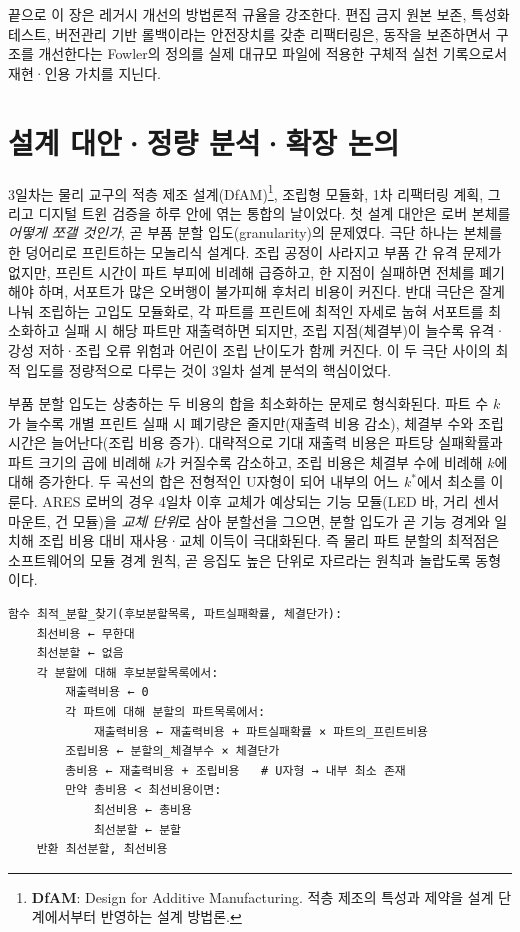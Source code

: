 끝으로 이 장은 레거시 개선의 방법론적 규율을 강조한다. 편집 금지 원본 보존\cite{ares-repo}, 특성화 테스트\cite{feathers2004legacy}, 버전관리 기반 롤백\cite{chacon2014progit, mcconnell2004codecomplete}이라는 안전장치를 갖춘 리팩터링은, 동작을 보존하면서 구조를 개선한다는 Fowler의 정의\cite{fowler2018refactoring}를 실제 대규모 파일에 적용한 구체적 실천 기록으로서 재현·인용 가치를 지닌다.





\section{설계 대안·정량 분석·확장 논의}

3일차는 물리 교구의 적층 제조 설계(DfAM)\footnote{\textbf{DfAM}: Design for Additive Manufacturing. 적층 제조의 특성과 제약을 설계 단계에서부터 반영하는 설계 방법론.}, 조립형 모듈화, 1차 리팩터링 계획, 그리고 디지털 트윈 검증을 하루 안에 엮는 통합의 날이었다. 첫 설계 대안은 로버 본체를 \emph{어떻게 쪼갤 것인가}, 곧 부품 분할 입도(granularity)의 문제였다. 극단 하나는 본체를 한 덩어리로 프린트하는 모놀리식 설계다. 조립 공정이 사라지고 부품 간 유격 문제가 없지만, 프린트 시간이 파트 부피에 비례해 급증하고, 한 지점이 실패하면 전체를 폐기해야 하며, 서포트가 많은 오버행이 불가피해 후처리 비용이 커진다. 반대 극단은 잘게 나눠 조립하는 고입도 모듈화로, 각 파트를 프린트에 최적인 자세로 눕혀 서포트를 최소화하고 실패 시 해당 파트만 재출력하면 되지만, 조립 지점(체결부)이 늘수록 유격·강성 저하·조립 오류 위험과 어린이 조립 난이도가 함께 커진다. 이 두 극단 사이의 최적 입도를 정량적으로 다루는 것이 3일차 설계 분석의 핵심이었다.

부품 분할 입도는 상충하는 두 비용의 합을 최소화하는 문제로 형식화된다. 파트 수 $k$가 늘수록 개별 프린트 실패 시 폐기량은 줄지만(재출력 비용 감소), 체결부 수와 조립 시간은 늘어난다(조립 비용 증가). 대략적으로 기대 재출력 비용은 파트당 실패확률과 파트 크기의 곱에 비례해 $k$가 커질수록 감소하고, 조립 비용은 체결부 수에 비례해 $k$에 대해 증가한다. 두 곡선의 합은 전형적인 U자형이 되어 내부의 어느 $k^{*}$에서 최소를 이룬다. ARES 로버의 경우 4일차 이후 교체가 예상되는 기능 모듈(LED 바, 거리 센서 마운트, 건 모듈)을 \emph{교체 단위}로 삼아 분할선을 그으면, 분할 입도가 곧 기능 경계와 일치해 조립 비용 대비 재사용·교체 이득이 극대화된다. 즉 물리 파트 분할의 최적점은 소프트웨어의 모듈 경계 원칙, 곧 응집도 높은 단위로 자르라는 원칙\cite{martin2008cleancode}과 놀랍도록 동형이다.

\begin{verbatim}
함수 최적_분할_찾기(후보분할목록, 파트실패확률, 체결단가):
    최선비용 ← 무한대
    최선분할 ← 없음
    각 분할에 대해 후보분할목록에서:
        재출력비용 ← 0
        각 파트에 대해 분할의 파트목록에서:
            재출력비용 ← 재출력비용 + 파트실패확률 × 파트의_프린트비용
        조립비용 ← 분할의_체결부수 × 체결단가
        총비용 ← 재출력비용 + 조립비용   # U자형 → 내부 최소 존재
        만약 총비용 < 최선비용이면:
            최선비용 ← 총비용
            최선분할 ← 분할
    반환 최선분할, 최선비용
\end{verbatim}

